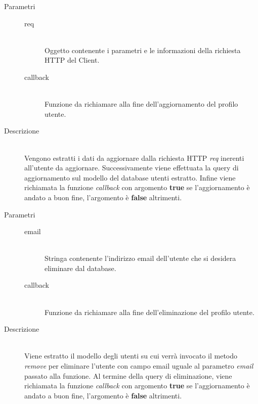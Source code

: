 \begin{description}
\begin{mldescription}
 		 \hfill
 			\begin{description}
 				\item[Parametri] \hfill
 					\begin{description}
 						\item[req] \hfill \\
 							Oggetto contenente i parametri e le informazioni della richiesta HTTP del Client.
 						\item[callback] \hfill \\
 							Funzione da richiamare alla fine dell'aggiornamento del profilo utente.
 					\end{description}
 				\item[Descrizione] \hfill \\
 				Vengono estratti i dati da aggiornare dalla richiesta HTTP \textit{req} inerenti all'utente da aggiornare. Successivamente viene effettuata la query di aggiornamento sul modello del database utenti estratto. Infine viene richiamata la funzione \textit{callback} con argomento \textbf{true} se l'aggiornamento è andato a buon fine, l'argomento è \textbf{false} altrimenti.
 			\end{description}
 			
 		 \hfill
 			\begin{description}
 				\item[Parametri] \hfill
 					\begin{description}
 						\item[email] \hfill \\
 							Stringa contenente l'indirizzo email dell'utente che si desidera eliminare dal database.
 						\item[callback] \hfill \\
 							Funzione da richiamare alla fine dell'eliminazione del profilo utente.
 					\end{description}
 				\item[Descrizione] \hfill \\
 				Viene estratto il modello degli utenti su cui verrà invocato il metodo \textit{remove} per eliminare l'utente con campo email uguale al parametro \textit{email} passato alla funzione. Al termine della query di eliminazione, viene richiamata la funzione \textit{callback} con argomento \textbf{true} se l'aggiornamento è andato a buon fine, l'argomento è \textbf{false} altrimenti.
 			\end{description}
 			
 	\end{mldescription}
\end{description}


